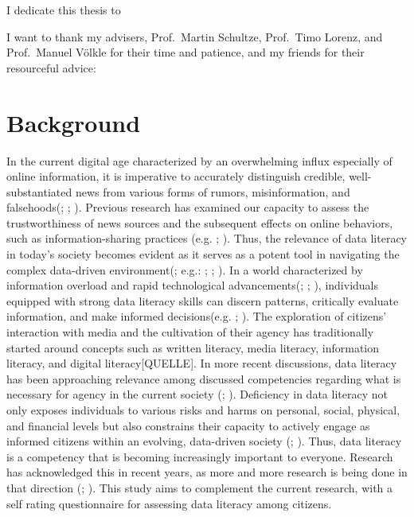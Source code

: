 \documentclass[
  12pt,
  a4paper,
  twoside]{article}
\begin{document}
I dedicate this thesis to

I want to thank my advisers, Prof.~Martin Schultze, Prof.~Timo Lorenz, and Prof.~Manuel Völkle for their time and patience, and my friends for their resourceful advice:

\newpage\null\thispagestyle{empty}\newpage

\section{Background}\label{background}

In the current digital age characterized by an overwhelming influx especially of online information, it is imperative to accurately distinguish credible, well-substantiated news from various forms of rumors, misinformation, and falsehoods(; ; ). Previous research has examined our capacity to assess the trustworthiness of news sources and the subsequent effects on online behaviors, such as information-sharing practices (e.g. ; ).
Thus, the relevance of data literacy in today's society becomes evident as it serves as a potent tool in navigating the complex data-driven environment(; e.g.: ; ; ). In a world characterized by information overload and rapid technological advancements(; ; ), individuals equipped with strong data literacy skills can discern patterns, critically evaluate information, and make informed decisions(e.g. ; ).
The exploration of citizens' interaction with media and the cultivation of their agency has traditionally started around concepts such as written literacy, media literacy, information literacy, and digital literacy{[}QUELLE{]}. In more recent discussions, data literacy has been approaching relevance among discussed competencies regarding what is necessary for agency in the current society (; ). Deficiency in data literacy not only exposes individuals to various risks and harms on personal, social, physical, and financial levels but also constrains their capacity to actively engage as informed citizens within an evolving, data-driven society (; ). Thus, data literacy is a competency that is becoming increasingly important to everyone. Research has acknowledged this in recent years, as more and more research is being done in that direction (; ). This study aims to complement the current research, with a self rating questionnaire for assessing data literacy among citizens.
\end{document}
